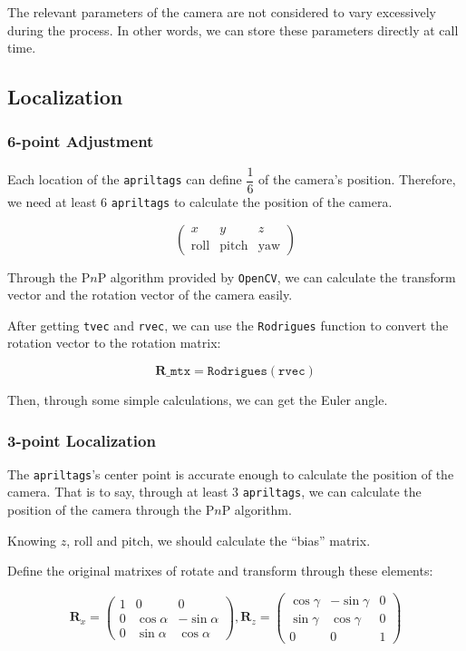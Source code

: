 \documentclass{article}
\begin{document}
The relevant parameters of the camera are not considered to vary excessively during the process. In other words, we can store these parameters directly at call time.

\subsection{Localization}

\subsubsection{6-point Adjustment}
Each location of the \texttt{apriltags} can define $\dfrac16$ of the camera's position. Therefore, we need at least $6$ \texttt{apriltags} to calculate the position of the camera.

\[
  \left(
    \begin{matrix}
      x&y&z\\
      \mathrm{roll}&\mathrm{pitch}&\mathrm{yaw}
    \end{matrix}
  \right)
\]

Through the P$n$P algorithm provided by \texttt{OpenCV}, we can calculate the transform vector and the rotation vector of the camera easily.

After getting \texttt{tvec} and \texttt{rvec}, we can use the \texttt{Rodrigues} function to convert the rotation vector to the rotation matrix:

\[
  \boldsymbol{R}\_\texttt{mtx}=\texttt{Rodrigues}\left(\texttt{rvec}\right)
\]

Then, through some simple calculations, we can get the Euler angle.

\subsubsection{3-point Localization}
The \texttt{apriltags}'s center point is accurate enough to calculate the position of the camera. That is to say, through at least $3$ \texttt{apriltags}, we can calculate the position of the camera through the P$n$P algorithm.

Knowing $z$, $\mathrm{roll}$ and $\mathrm{pitch}$, we should calculate the ``bias'' matrix.

Define the original matrixes of rotate and transform through these elements:

\begin{equation}
  \boldsymbol{R}_x=
  \left(
    \begin{matrix}
      1 & 0 & 0 \\
      0 & \cos\alpha & -\sin\alpha \\
      0 & \sin\alpha & \cos\alpha
    \end{matrix}
  \right),
  \boldsymbol{R}_z=
  \left(
    \begin{matrix}
      \cos\gamma & -\sin\gamma & 0 \\
      \sin\gamma & \cos\gamma & 0 \\
      0 & 0 & 1
    \end{matrix}
  \right)
\end{equation}
\end{document}
